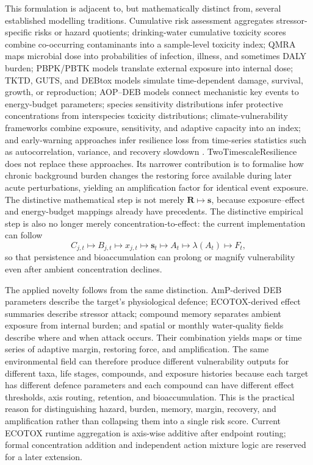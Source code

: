 This formulation is adjacent to, but mathematically distinct from, several established modelling traditions. Cumulative risk assessment aggregates stressor-specific risks or hazard quotients; drinking-water cumulative toxicity scores combine co-occurring contaminants into a sample-level toxicity index; QMRA maps microbial dose into probabilities of infection, illness, and sometimes DALY burden; PBPK/PBTK models translate external exposure into internal dose; TKTD, GUTS, and DEBtox models simulate time-dependent damage, survival, growth, or reproduction; AOP--DEB models connect mechanistic key events to energy-budget parameters; species sensitivity distributions infer protective concentrations from interspecies toxicity distributions; climate-vulnerability frameworks combine exposure, sensitivity, and adaptive capacity into an index; and early-warning approaches infer resilience loss from time-series statistics such as autocorrelation, variance, and recovery slowdown \citep{sexton2012cumulative,stoiber2019drinking,who2016qmra,huang2024pbpk,efsa2018tktd,murphy2018aopdeb,fox2021ssd,hyman2024ccva,dakos2024tipping}. TwoTimescaleResilience does not replace these approaches. Its narrower contribution is to formalise how chronic background burden changes the restoring force available during later acute perturbations, yielding an amplification factor for identical event exposure. The distinctive mathematical step is not merely $\mathbf{R}\mapsto\mathbf{s}$, because exposure--effect and energy-budget mappings already have precedents. The distinctive empirical step is also no longer merely concentration-to-effect: the current implementation can follow
\begin{equation}
  C_{j,t}\mapsto B_{j,t}\mapsto x_{j,t}\mapsto \mathbf{s}_{t}\mapsto A_t\mapsto\lambda(A_t)\mapsto F_t,
  \label{eq:memory_chain}
\end{equation}
so that persistence and bioaccumulation can prolong or magnify vulnerability even after ambient concentration declines.

The applied novelty follows from the same distinction. AmP-derived DEB parameters describe the target's physiological defence; ECOTOX-derived effect summaries describe stressor attack; compound memory separates ambient exposure from internal burden; and spatial or monthly water-quality fields describe where and when attack occurs. Their combination yields maps or time series of adaptive margin, restoring force, and amplification. The same environmental field can therefore produce different vulnerability outputs for different taxa, life stages, compounds, and exposure histories because each target has different defence parameters and each compound can have different effect thresholds, axis routing, retention, and bioaccumulation. This is the practical reason for distinguishing hazard, burden, memory, margin, recovery, and amplification rather than collapsing them into a single risk score. Current ECOTOX runtime aggregation is axis-wise additive after endpoint routing; formal concentration addition and independent action mixture logic are reserved for a later extension.

